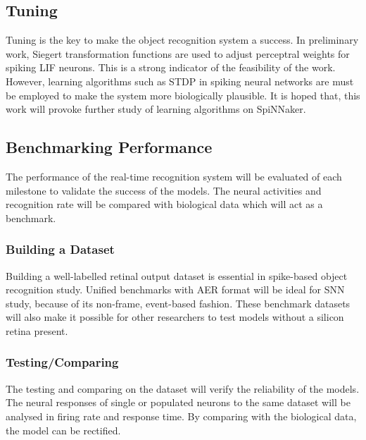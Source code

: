 \documentclass[journal]{journal}
\begin{document}
\subsection{Tuning}
Tuning is the key to make the object recognition system a success.
In preliminary work, Siegert transformation functions are used to adjust perceptral weights for spiking LIF neurons.
This is a strong indicator of the feasibility of the work.
However, learning algorithms such as STDP in spiking neural networks are must be employed to make the system more biologically plausible.
It is hoped that, this work will provoke further study of learning algorithms on SpiNNaker.
\subsection{Benchmarking Performance}
The performance of the real-time recognition system will be evaluated of each milestone to validate the success of the models.
The neural activities and recognition rate will be compared with biological data which will act as a benchmark.
\subsubsection{Building a Dataset}
Building a well-labelled retinal output dataset is essential in spike-based object recognition study.
Unified benchmarks with AER format will be ideal for SNN study, because of its non-frame, event-based fashion.
These benchmark datasets will also make it possible for other researchers to test models without a silicon retina present.
\subsubsection{Testing/Comparing}
The testing and comparing on the dataset will verify the reliability of the models.
The neural responses of single or populated neurons to the same dataset will be analysed in firing rate and response time.
By comparing with the biological data, the model can be rectified. %



\end{document}
